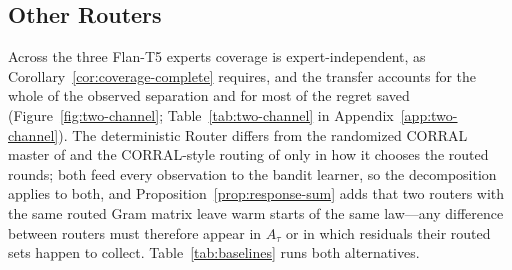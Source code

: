 \documentclass[anon]{alt2027} %
\begin{document}
\subsection{Other Routers}
\label{app:routers}

Across the three Flan-T5 experts coverage is
expert-independent, as Corollary~\ref{cor:coverage-complete} requires, and the
transfer accounts for the whole of the observed separation and for most of the
regret saved (Figure~\ref{fig:two-channel}; Table~\ref{tab:two-channel} in
Appendix~\ref{app:two-channel}). The deterministic Router differs from the
randomized CORRAL master of \citet{agarwal2017corralling} and the CORRAL-style
routing of \citet{chen2024llmdecision} only in how it chooses the routed
rounds; both feed every observation to the bandit learner, so the
decomposition applies to both, and Proposition~\ref{prop:response-sum} adds
that two routers with the same routed Gram matrix leave warm starts of the
same law---any difference between routers must therefore appear in $A_\tau$ or
in which residuals their routed sets happen to collect.
Table~\ref{tab:baselines} runs both alternatives.
\end{document}
